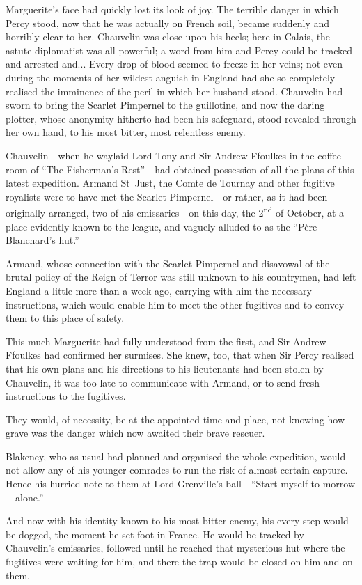 Marguerite's face had quickly lost its look of joy. The terrible danger in which Percy stood, now that he was actually on French soil, became suddenly and horribly clear to her. Chauvelin was close upon his heels; here in Calais, the astute diplomatist was all-powerful; a word from him and Percy could be tracked and arrested and... Every drop of blood seemed to freeze in her veins; not even during the moments of her wildest anguish in England had she so completely realised the imminence of the peril in which her husband stood. Chauvelin had sworn to bring the Scarlet Pimpernel to the guillotine, and now the daring plotter, whose anonymity hitherto had been his safeguard, stood revealed through her own hand, to his most bitter, most relentless enemy.

Chauvelin---when he waylaid Lord Tony and Sir Andrew Ffoulkes in the coffee-room of \enquote{The Fisherman's Rest}---had obtained possession of all the plans of this latest expedition. Armand St~Just, the Comte de Tournay and other fugitive royalists were to have met the Scarlet Pimpernel---or rather, as it had been originally arranged, two of his emissaries---on this day, the 2\textsuperscript{nd} of October, at a place evidently known to the league, and vaguely alluded to as the \enquote{Père Blanchard's hut.}

Armand, whose connection with the Scarlet Pimpernel and disavowal of the brutal policy of the Reign of Terror was still unknown to his countrymen, had left England a little more than a week ago, carrying with him the necessary instructions, which would enable him to meet the other fugitives and to convey them to this place of safety.

This much Marguerite had fully understood from the first, and Sir Andrew Ffoulkes had confirmed her surmises. She knew, too, that when Sir Percy realised that his own plans and his directions to his lieutenants had been stolen by Chauvelin, it was too late to communicate with Armand, or to send fresh instructions to the fugitives.

They would, of necessity, be at the appointed time and place, not knowing how grave was the danger which now awaited their brave rescuer.

Blakeney, who as usual had planned and organised the whole expedition, would not allow any of his younger comrades to run the risk of almost certain capture. Hence his hurried note to them at Lord Grenville's ball---\enquote{Start myself to-morrow---alone.}

And now with his identity known to his most bitter enemy, his every step would be dogged, the moment he set foot in France. He would be tracked by Chauvelin's emissaries, followed until he reached that mysterious hut where the fugitives were waiting for him, and there the trap would be closed on him and on them.


